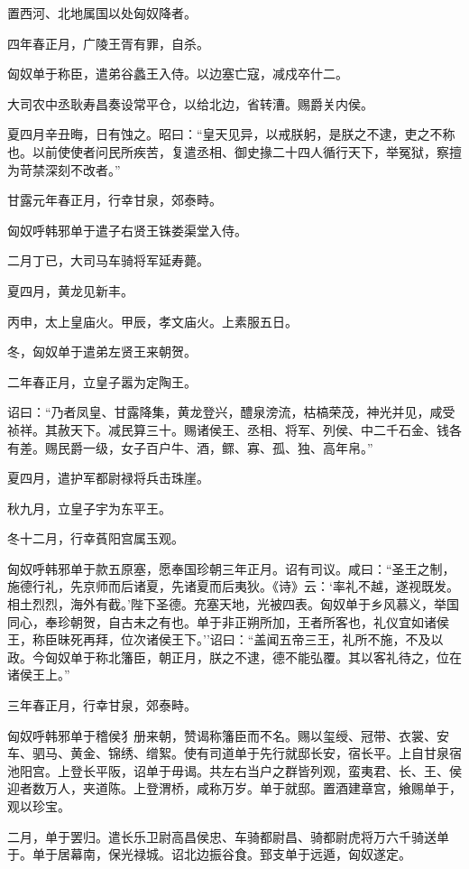 \documentclass[]{article}
\begin{document}
置西河、北地属国以处匈奴降者。

四年春正月，广陵王胥有罪，自杀。

匈奴单于称臣，遣弟谷蠡王入侍。以边塞亡寇，减戍卒什二。

大司农中丞耿寿昌奏设常平仓，以给北边，省转漕。赐爵关内侯。

夏四月辛丑晦，日有蚀之。昭曰：``皇天见异，以戒朕躬，是朕之不逮，吏之不称也。以前使使者问民所疾苦，复遣丞相、御史掾二十四人循行天下，举冤狱，察擅为苛禁深刻不改者。''

甘露元年春正月，行幸甘泉，郊泰畤。

匈奴呼韩邪单于遣子右贤王铢娄渠堂入侍。

二月丁已，大司马车骑将军延寿薨。

夏四月，黄龙见新丰。

丙申，太上皇庙火。甲辰，孝文庙火。上素服五日。

冬，匈奴单于遣弟左贤王来朝贺。

二年春正月，立皇子嚣为定陶王。

诏曰：``乃者凤皇、甘露降集，黄龙登兴，醴泉滂流，枯槁荣茂，神光并见，咸受祯祥。其赦天下。减民算三十。赐诸侯王、丞相、将军、列侯、中二千石金、钱各有差。赐民爵一级，女子百户牛、酒，鳏、寡、孤、独、高年帛。''

夏四月，遣护军都尉禄将兵击珠崖。

秋九月，立皇子宇为东平王。

冬十二月，行幸萯阳宫属玉观。

匈奴呼韩邪单于款五原塞，愿奉国珍朝三年正月。诏有司议。咸曰：``圣王之制，施德行礼，先京师而后诸夏，先诸夏而后夷狄。《诗》云：`率礼不越，遂视既发。相土烈烈，海外有截。'陛下圣德。充塞天地，光被四表。匈奴单于乡风慕义，举国同心，奉珍朝贺，自古未之有也。单于非正朔所加，王者所客也，礼仪宜如诸侯王，称臣昧死再拜，位次诸侯王下。''诏曰：``盖闻五帝三王，礼所不施，不及以政。今匈奴单于称北籓臣，朝正月，朕之不逮，德不能弘覆。其以客礼待之，位在诸侯王上。''

三年春正月，行幸甘泉，郊泰畤。

匈奴呼韩邪单于稽侯犭册来朝，赞谒称籓臣而不名。赐以玺绶、冠带、衣裳、安车、驷马、黄金、锦绣、缯絮。使有司道单于先行就邸长安，宿长平。上自甘泉宿池阳宫。上登长平阪，诏单于毋谒。共左右当户之群皆列观，蛮夷君、长、王、侯迎者数万人，夹道陈。上登渭桥，咸称万岁。单于就邸。置酒建章宫，飨赐单于，观以珍宝。

二月，单于罢归。遣长乐卫尉高昌侯忠、车骑都尉昌、骑都尉虎将万六千骑送单于。单于居幕南，保光禄城。诏北边振谷食。郅支单于远遁，匈奴遂定。
\end{document}

